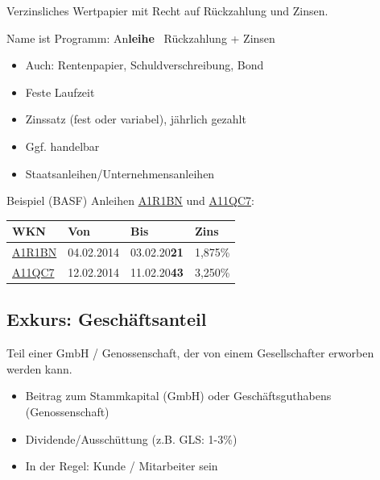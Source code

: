 \documentclass{beamer}
\newcommand{\wkn}[1]{\href{https://www.finanzen.net/anleihen/#1}{#1}}
\begin{document}
			\begin{frame}
				\begin{definition}
					Verzinsliches Wertpapier mit Recht auf Rückzahlung und Zinsen.
				\end{definition}
				Name ist Programm: An\textbf{leihe} \textrightarrow\ Rückzahlung + Zinsen
				\begin{itemize}
					\item Auch: Rentenpapier, Schuldverschreibung, Bond
					\item Feste Laufzeit
					\item Zinssatz (fest oder variabel), jährlich gezahlt
					\item Ggf. handelbar
					\item Staatsanleihen/Unternehmensanleihen
				\end{itemize}
			\end{frame}
		
			\begin{frame}{Beispiel (BASF)}
				Anleihen \href{https://www.finanzen.net/anleihen/a1r1bn-basf-se-anleihe}{A1R1BN} und \href{https://www.finanzen.net/anleihen/a11qc7-basf-se-anleihe}{A11QC7}:
				\begin{center}
					\begin{tabularx}{8cm}{l|l|l|l}
						WKN				& Von			& Bis					& Zins		\\
						\hline
						\wkn{A1R1BN}	& 04.02.2014	& 03.02.20\textbf{21}	& 1,875\%	\\
						\wkn{A11QC7}	& 12.02.2014	& 11.02.20\textbf{43}	& 3,250\%	\\
					\end{tabularx}
				\end{center}
			\end{frame}
		
		\subsection{Exkurs: Geschäftsanteil}
		
			\begin{frame}
				\begin{definition}
					Teil einer GmbH / Genossenschaft, der von einem Gesellschafter erworben werden kann.\citewiki{Geschäftsanteil}
				\end{definition}
			
				\begin{itemize}
					\item Beitrag zum Stammkapital (GmbH) oder Geschäftsguthabens (Genossenschaft)
					\item Dividende/Ausschüttung (z.B. GLS: 1-3\%)
					\item In der Regel: Kunde / Mitarbeiter sein
				\end{itemize}
			\end{frame}
		
\end{document}
